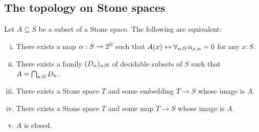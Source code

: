 \subsection{The topology on Stone spaces}
\begin{theorem}\label{StoneClosedSubsets}
  Let $A\subseteq S$ be a subset of a Stone space. The following are equivalent:
  \begin{enumerate}[(i)]
    \item There exists a map $\alpha:S \to 2^{\mathbb{N}}$ such that 
      $A (x) \leftrightarrow \forall_{n:\mathbb{N}}\, \alpha_{x,n} = 0$ for any $x:S$. 
    \item There exists a family 
      $(D_n)_{n:\mathbb{N}}$ 
      of decidable subsets of $S$ such that $A = \bigcap_{n:\mathbb{N}} D_n$. 
    \item There exists a Stone space $T$ and some embedding $T\to S$ whose image is $A$.
    \item There exists a Stone space $T$ and some map $T\to S$ whose image is $A$. 
    \item $A$ is closed.
  \end{enumerate}
\end{theorem}
